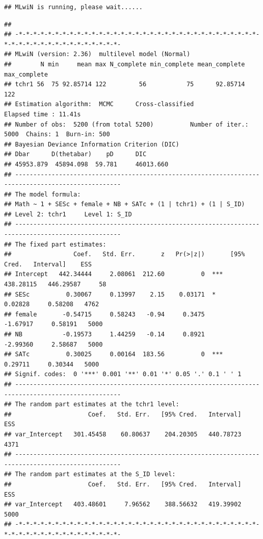 \documentclass[
]{book}
\begin{document}
\begin{verbatim}
## MLwiN is running, please wait......
\end{verbatim}

\begin{verbatim}
## 
## -*-*-*-*-*-*-*-*-*-*-*-*-*-*-*-*-*-*-*-*-*-*-*-*-*-*-*-*-*-*-*-*-*-*-*-*-*-*-*-*-*-*-*-*-*-*-*-*-*- 
## MLwiN (version: 2.36)  multilevel model (Normal) 
##        N min     mean max N_complete min_complete mean_complete max_complete
## tchr1 56  75 92.85714 122         56           75      92.85714          122
## Estimation algorithm:  MCMC      Cross-classified              Elapsed time : 11.41s 
## Number of obs:  5200 (from total 5200)          Number of iter.: 5000  Chains: 1  Burn-in: 500 
## Bayesian Deviance Information Criterion (DIC)
## Dbar      D(thetabar)    pD      DIC
## 45953.879  45894.098  59.781     46013.660  
## --------------------------------------------------------------------------------------------------- 
## The model formula:
## Math ~ 1 + SESc + female + NB + SATc + (1 | tchr1) + (1 | S_ID)
## Level 2: tchr1     Level 1: S_ID      
## --------------------------------------------------------------------------------------------------- 
## The fixed part estimates:  
##                 Coef.   Std. Err.       z   Pr(>|z|)       [95% Cred.   Interval]    ESS 
## Intercept   442.34444     2.08061  212.60          0  ***   438.28115   446.29587     58 
## SESc          0.30067     0.13997    2.15    0.03171  *       0.02828     0.58208   4762 
## female       -0.54715     0.58243   -0.94     0.3475         -1.67917     0.58191   5000 
## NB           -0.19573     1.44259   -0.14     0.8921         -2.99360     2.58687   5000 
## SATc          0.30025     0.00164  183.56          0  ***     0.29711     0.30344   5000 
## Signif. codes:  0 '***' 0.001 '**' 0.01 '*' 0.05 '.' 0.1 ' ' 1  
## --------------------------------------------------------------------------------------------------- 
## The random part estimates at the tchr1 level: 
##                     Coef.   Std. Err.   [95% Cred.   Interval]    ESS 
## var_Intercept   301.45458    60.80637    204.20305   440.78723   4371 
## --------------------------------------------------------------------------------------------------- 
## The random part estimates at the S_ID level: 
##                     Coef.   Std. Err.   [95% Cred.   Interval]    ESS 
## var_Intercept   403.48601     7.96562    388.56632   419.39902   5000 
## -*-*-*-*-*-*-*-*-*-*-*-*-*-*-*-*-*-*-*-*-*-*-*-*-*-*-*-*-*-*-*-*-*-*-*-*-*-*-*-*-*-*-*-*-*-*-*-*-*-
\end{verbatim}
\end{document}
